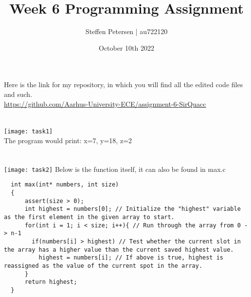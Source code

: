 \documentclass{article}
\title{Week 6 Programming Assignment}
\author{Steffen Petersen | au722120}
\date{October 10th 2022}
\begin{document}

\maketitle
\vspace{5pt}
\noindent Here is the link for my repository, in which you will find all the edited code files and such.\\
\url{https://github.com/Aarhus-University-ECE/assignment-6-SirQuacc}
\section{}
\texttt{[image: task1]}
\vspace{2pt}\\
The program would print: x=7, y=18, z=2
\pagebreak

\section{}
\texttt{[image: task2]}
\vspace{2pt}
Below is the function itself, it can also be found in max.c
\begin{lstlisting}
  int max(int* numbers, int size)
  {
      assert(size > 0);
      int highest = numbers[0]; // Initialize the "highest" variable as the first element in the given array to start.
      for(int i = 1; i < size; i++){ // Run through the array from 0 -> n-1
        if(numbers[i] > highest) // Test whether the current slot in the array has a higher value than the current saved highest value.
          highest = numbers[i]; // If above is true, highest is reassigned as the value of the current spot in the array.
      }
      return highest;
  }
\end{lstlisting}
\pagebreak
\end{document}
